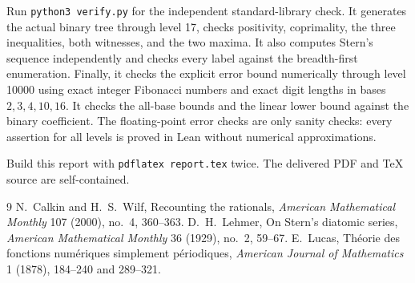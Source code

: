 \documentclass[11pt]{article}
\begin{document}
Run \texttt{python3 verify.py} for the independent standard-library check.
It generates the actual binary tree through level 17, checks positivity,
coprimality, the three inequalities, both witnesses, and the two maxima.
It also computes Stern's sequence independently and checks every label
against the breadth-first enumeration. Finally, it checks the explicit
error bound numerically through level 10000 using exact integer Fibonacci
numbers and exact digit lengths in bases $2,3,4,10,16$. It checks the
all-base bounds and the linear lower bound against the binary coefficient. The floating-point error checks are only
sanity checks: every assertion for all levels is proved in Lean without
numerical approximations.

Build this report with \texttt{pdflatex report.tex} twice. The delivered
PDF and TeX source are self-contained.

\begin{thebibliography}{9}
 N.~Calkin and H.~S.~Wilf,
Recounting the rationals, \emph{American Mathematical Monthly}
107 (2000), no.~4, 360--363.
 D.~H.~Lehmer,
On Stern's diatomic series, \emph{American Mathematical Monthly}
36 (1929), no.~2, 59--67.
 E.~Lucas,
Th\'eorie des fonctions num\'eriques simplement p\'eriodiques,
\emph{American Journal of Mathematics} 1 (1878),
184--240 and 289--321.
\end{thebibliography}
\end{document}
